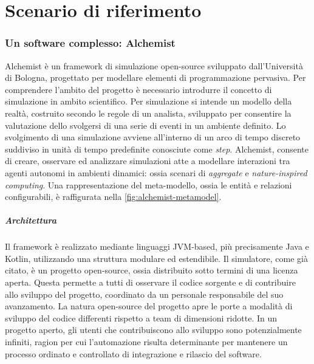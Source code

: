 
\chapter{Scenario di riferimento}


\subsection{Un software complesso: Alchemist}\label{sec:alchemist}
Alchemist\cite{Pianini_2013} è un framework di simulazione open-source sviluppato dall'Università di Bologna, progettato per modellare elementi di programmazione pervasiva. Per comprendere l'ambito del progetto è necessario introdurre il concetto di simulazione in ambito scientifico. Per simulazione si intende un modello della realtà, costruito secondo le regole di un analista, sviluppato per consentire la valutazione dello svolgersi di una serie di eventi in un ambiente definito. Lo svolgimento di una simulazione avviene all'interno di un arco di tempo discreto suddiviso in unità di tempo predefinite conosciute come \textit{step}. Alchemist, consente di creare, osservare ed analizzare simulazioni atte a modellare interazioni tra agenti autonomi in ambienti dinamici: ossia scenari di \textit{aggregate} e \textit{nature-inspired computing}. Una rappresentazione del meta-modello, ossia le entità e relazioni configurabili, è raffigurata nella \cref{fig:alchemist-metamodel}.


\paragraph{Architettura} %
Il framework è realizzato mediante linguaggi JVM-based, più precisamente Java e Kotlin, utilizzando una struttura modulare ed estendibile. Il simulatore, come già citato, è un progetto open-source, ossia distribuito sotto termini di una licenza aperta. Questa permette a tutti di osservare il codice sorgente e di contribuire allo sviluppo del progetto, coordinato da un personale responsabile del suo avanzamento. La natura open-source del progetto apre le porte a modalità di sviluppo del codice differenti rispetto a team di dimensioni ridotte. In un progetto aperto, gli utenti che contribuiscono allo sviluppo sono potenzialmente infiniti, ragion per cui l'automazione risulta determinante per mantenere un processo ordinato e controllato di integrazione e rilascio del software.

